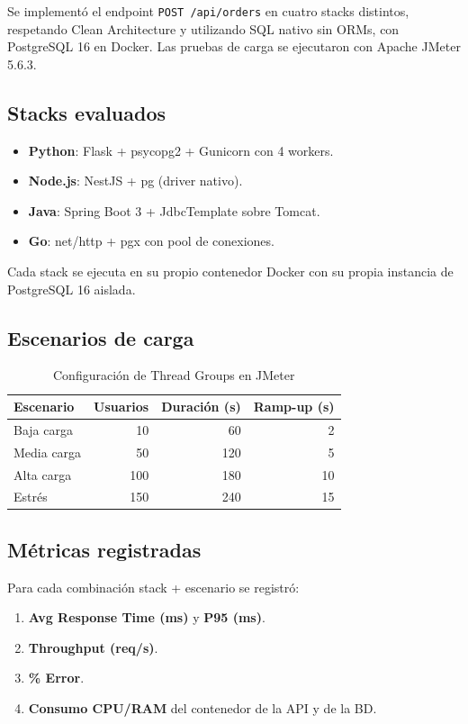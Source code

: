 \documentclass[12pt,a4paper]{article}
\begin{document}
Se implementó el endpoint \texttt{POST /api/orders} en cuatro stacks distintos, respetando Clean Architecture y utilizando SQL nativo sin ORMs, con PostgreSQL 16 en Docker. Las pruebas de carga se ejecutaron con Apache JMeter 5.6.3.

\subsection{Stacks evaluados}

\begin{itemize}
    \item \textbf{Python}: Flask + psycopg2 + Gunicorn con 4 workers.
    \item \textbf{Node.js}: NestJS + pg (driver nativo).
    \item \textbf{Java}: Spring Boot 3 + JdbcTemplate sobre Tomcat.
    \item \textbf{Go}: net/http + pgx con pool de conexiones.
\end{itemize}

Cada stack se ejecuta en su propio contenedor Docker con su propia instancia de PostgreSQL 16 aislada.

\subsection{Escenarios de carga}

\begin{table}[h]
\centering
\begin{tabular}{lrrr}
\toprule
\textbf{Escenario} & \textbf{Usuarios} & \textbf{Duración (s)} & \textbf{Ramp-up (s)} \\
\midrule
Baja carga   & 10  & 60  & 2  \\
Media carga  & 50  & 120 & 5  \\
Alta carga   & 100 & 180 & 10 \\
Estrés       & 150 & 240 & 15 \\
\bottomrule
\end{tabular}
\caption{Configuración de Thread Groups en JMeter}
\end{table}

\subsection{Métricas registradas}

Para cada combinación stack + escenario se registró:

\begin{enumerate}
    \item \textbf{Avg Response Time (ms)} y \textbf{P95 (ms)}.
    \item \textbf{Throughput (req/s)}.
    \item \textbf{\% Error}.
    \item \textbf{Consumo CPU/RAM} del contenedor de la API y de la BD.
\end{enumerate}
\end{document}
